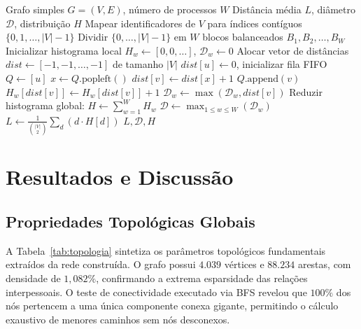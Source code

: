 \documentclass[conference]{IEEEtran}
\begin{document}
\begin{algorithm}[htbp]
\caption{Cálculo Paralelizado de Menores Caminhos (APSP-BFS)}
\label{alg:bfs_paralela}
\begin{algorithmic}[1]
\REQUIRE Grafo simples $G=(V, E)$, número de processos $W$
\ENSURE Distância média $L$, diâmetro $\mathcal{D}$, distribuição $H$
\STATE Mapear identificadores de $V$ para índices contíguos $\{0, 1, \dots, |V|-1\}$
\STATE Dividir $\{0, \dots, |V|-1\}$ em $W$ blocos balanceados $B_1, B_2, \dots, B_W$
    \STATE Inicializar histograma local $H_w \leftarrow [0, 0, \dots]$, $\mathcal{D}_w \leftarrow 0$
        \STATE Alocar vetor de distâncias $dist \leftarrow [-1, -1, \dots, -1]$ de tamanho $|V|$
        \STATE $dist[u] \leftarrow 0$, inicializar fila FIFO $Q \leftarrow [u]$
            \STATE $x \leftarrow Q.\text{popleft}()$
                    \STATE $dist[v] \leftarrow dist[x] + 1$
                    \STATE $Q.\text{append}(v)$
                        \STATE $H_w[dist[v]] \leftarrow H_w[dist[v]] + 1$
                        \STATE $\mathcal{D}_w \leftarrow \max(\mathcal{D}_w, dist[v])$
                    \ENDIF
                \ENDIF
            \ENDFOR
        \ENDWHILE
    \ENDFOR
\ENDFOR
\STATE Reduzir histograma global: $H \leftarrow \sum_{w=1}^W H_w$
\STATE $\mathcal{D} \leftarrow \max_{1 \le w \le W}(\mathcal{D}_w)$
\STATE $L \leftarrow \frac{1}{\binom{|V|}{2}} \sum_{d} (d \cdot H[d])$
\RETURN $L, \mathcal{D}, H$
\end{algorithmic}
\end{algorithm}

\section{Resultados e Discussão}
\label{sec:resultados}

\subsection{Propriedades Topológicas Globais}
A Tabela~\ref{tab:topologia} sintetiza os parâmetros topológicos fundamentais extraídos da rede construída. O grafo possui $4.039$ vértices e $88.234$ arestas, com densidade de $1,082\%$, confirmando a extrema esparsidade das relações interpessoais. O teste de conectividade executado via BFS revelou que $100\%$ dos nós pertencem a uma única componente conexa gigante, permitindo o cálculo exaustivo de menores caminhos sem nós desconexos.
\end{document}
